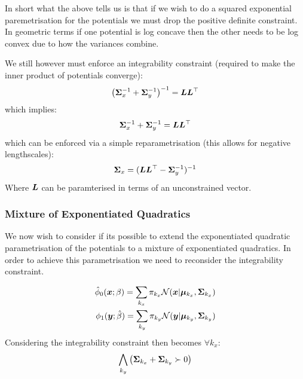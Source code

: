 \documentclass[a4paper,12pt,twoside,openright]{report}
\theoremstyle{definition}
\begin{document}
In short what the above tells us is that if we wish to do a squared exponential paremetrisation for the potentials we must drop the positive definite constraint. In geometric terms if one potential is log concave then the other needs to be log convex due to how the variances combine.

We still however must enforce an integrability constraint (required to make the inner product of potentials converge):
\begin{align*}
\left({\bm{\Sigma}}_x^{-1} +{\bm{\Sigma}}_y^{-1}\right)^{-1} = {\bm{L}}{\bm{L}}^{\top}
\end{align*}
which implies:
\begin{align*}
{\bm{\Sigma}}_x^{-1} +{\bm{\Sigma}}_y^{-1} = {\bm{L}}{\bm{L}}^{\top}
\end{align*}
which can be enforced via a simple reparametrisation (this allows for negative lengthscales):
\begin{align*}
{\bm{\Sigma}}_x = ({\bm{L}}{\bm{L}}^{\top} -{\bm{\Sigma}}_y^{-1})^{-1}
\end{align*}
Where ${\bm{L}}$ can be paramterised in terms of an unconstrained vector.
\subsubsection{Mixture of Exponentiated Quadratics}


We now wish to consider if its possible to extend the exponentiated quadratic  parametrisation of the potentials to a mixture of exponentiated quadratics. In order to achieve this parametrisation we need to reconsider the integrability constraint.

\begin{align}
{\hat{\phi}}_0( {\bm{x}} ; \beta) =  \sum_{k_x} \pi_{k_x} {\mathcal{N}}({\bm{x}} | {\bm{\mu}}_{k_x}, {\bm{\Sigma}}_{k_x}) \\
\phi_1( {\bm{y}} ; \hat{\beta}) = \sum_{k_y} \pi_{k_y}  {\mathcal{N}}({\bm{y}} | {\bm{\mu}}_{k_y}, {\bm{\Sigma}}_{k_y}) 
\end{align}
Considering  the integrability constraint then becomes $\forall k_x$:
\begin{align*}
   \bigwedge_{k_y} \left({\bm{\Sigma}}_{k_x} +{\bm{\Sigma}}_{k_y} \succ 0\right) 
\end{align*}
\end{document}
